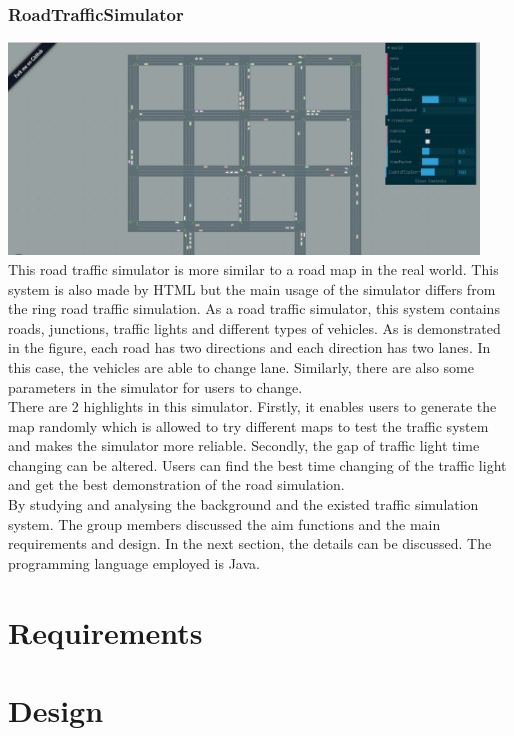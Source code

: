\documentclass[a4paper,12pt]{article}
\begin{document}
\subsubsection{RoadTrafficSimulator}
\includegraphics[width=12.5cm]{RoadTrafficSimulator.eps}\\
This road traffic simulator is more similar to a road map in the real world. This system is also made by HTML but the main usage of the simulator differs from the ring road traffic simulation. As a road traffic simulator, this system contains roads, junctions, traffic lights and different types of vehicles.
As is demonstrated in the figure, each road has two directions and each direction has two lanes. In this case, the vehicles are able to change lane. Similarly, there are also some parameters in the simulator for users to change.\\
There are 2 highlights in this simulator. Firstly, it enables users to generate the map randomly which is allowed to try different maps to test the traffic system and makes the simulator more reliable. Secondly, the gap of traffic light time changing can be altered. Users can find the best time changing of the traffic light and get the best demonstration of the road simulation.\\
By studying and analysing the background and the existed traffic simulation system. The group members discussed the aim functions and the main requirements and design. In the next section, the details can be discussed. The programming language employed is Java.\\

\section{Requirements}

\section{Design}
\end{document}
